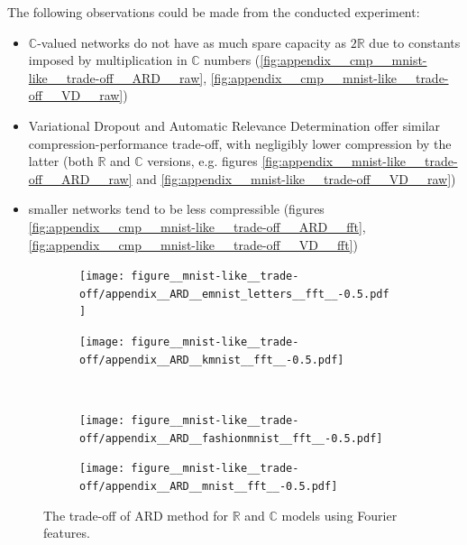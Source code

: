 \documentclass[a4paper]{extarticle}
\newcommand{\real}{\mathbb{R}}
\newcommand{\cplx}{\mathbb{C}}
\begin{document}
The following observations could be made from the conducted experiment:
\begin{itemize}
  \item $\cplx$-valued networks do not have as much spare capacity as $2 \real$ due to
  constants imposed by multiplication in $\cplx$ numbers (\ref{fig:appendix__cmp__mnist-like__trade-off__ARD__raw},
  \ref{fig:appendix__cmp__mnist-like__trade-off__VD__raw})
  \item Variational Dropout and Automatic Relevance Determination offer similar compression-performance
  trade-off, with negligibly lower compression by the latter (both $\real$ and $\cplx$ versions,
  e.g. figures \ref{fig:appendix__mnist-like__trade-off__ARD__raw} and \ref{fig:appendix__mnist-like__trade-off__VD__raw})
  \item smaller networks tend to be less compressible (figures \ref{fig:appendix__cmp__mnist-like__trade-off__ARD__fft},
  \ref{fig:appendix__cmp__mnist-like__trade-off__VD__fft})
\end{itemize}

\begin{figure}[ht]
  \centering
  \begin{subfigure}[b]{0.5\textwidth}
    \centering
    \texttt{[image: figure\_\_mnist-like\_\_trade-off/appendix\_\_ARD\_\_emnist\_letters\_\_fft\_\_-0.5.pdf]}
  \end{subfigure}%
  \begin{subfigure}[b]{0.5\textwidth}
    \centering
    \texttt{[image: figure\_\_mnist-like\_\_trade-off/appendix\_\_ARD\_\_kmnist\_\_fft\_\_-0.5.pdf]}
  \end{subfigure} \\ %
  \begin{subfigure}[b]{0.5\textwidth}
    \centering
    \texttt{[image: figure\_\_mnist-like\_\_trade-off/appendix\_\_ARD\_\_fashionmnist\_\_fft\_\_-0.5.pdf]}
  \end{subfigure}%
  \begin{subfigure}[b]{0.5\textwidth}
    \centering
    \texttt{[image: figure\_\_mnist-like\_\_trade-off/appendix\_\_ARD\_\_mnist\_\_fft\_\_-0.5.pdf]}
  \end{subfigure}
  \caption{%
    The trade-off of ARD method for $\real$ and $\cplx$ models using Fourier features.
  }
  \label{fig:appendix__mnist-like__trade-off__ARD__fft}
\end{figure}
\end{document}

